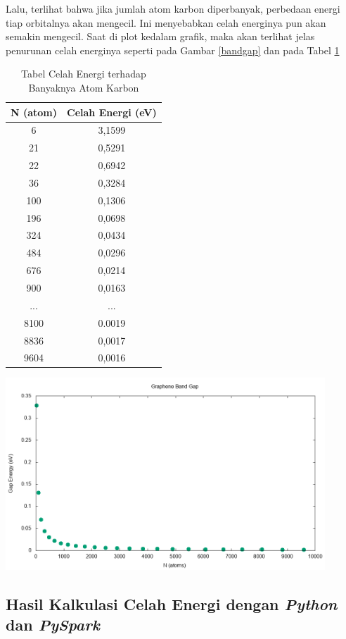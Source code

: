 \documentclass[12pt,a4paper]{report}
\begin{document}
Lalu, terlihat bahwa jika jumlah atom karbon diperbanyak, perbedaan energi tiap orbitalnya akan mengecil. Ini menyebabkan celah energinya pun akan semakin mengecil. Saat di plot kedalam grafik, maka akan terlihat jelas penurunan celah energinya seperti pada Gambar \ref{bandgap} dan pada Tabel \ref{gaptable}
\begin{table}[h]
	\centering
	\caption{Tabel Celah Energi terhadap Banyaknya Atom Karbon}
	\label{gaptable}
	\begin{tabular}{|c|c|} 
		\hline
		N (atom) & Celah Energi (eV)\\ \hline
		6 & 3,1599 \\ \hline
		21 & 0,5291 \\ \hline
		22 & 0,6942 \\ \hline
		36 & 0,3284 \\ \hline
		100 & 0,1306 \\ \hline
		196 & 0,0698 \\ \hline
		324 & 0,0434 \\ \hline
		484 & 0,0296 \\ \hline
		676 & 0,0214 \\ \hline
		900 & 0,0163 \\ \hline
		... & ... \\ \hline
		8100 & 0.0019 \\ \hline
		8836 & 0,0017 \\ \hline
		9604 & 0,0016 \\ \hline
	\end{tabular}
\end{table}
\begin{center}
	\includegraphics[width=12cm]{gambar/bandgap.png}
	\label{bandgap}
\end{center}

\subsection{Hasil Kalkulasi Celah Energi dengan \textit{Python} dan \textit{PySpark}}
\end{document}
